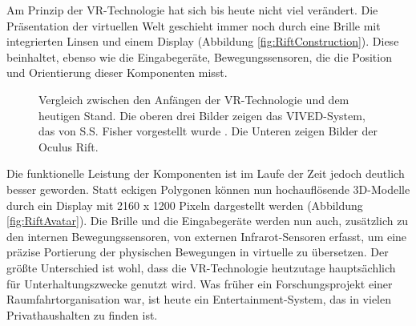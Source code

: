 Am Prinzip der VR-Technologie hat sich bis heute nicht viel verändert. Die Präsentation der virtuellen Welt geschieht immer noch durch eine Brille mit integrierten Linsen und einem Display (Abbildung \ref{fig:RiftConstruction}). Diese beinhaltet, ebenso wie die Eingabegeräte, Bewegungssensoren, die die Position und Orientierung dieser Komponenten misst.\\ 

\begin{figure}%
    \centering
    \qquad
    \qquad
    \qquad
    \qquad
    \qquad
    \caption{Vergleich zwischen den Anfängen der VR-Technologie und dem heutigen Stand. Die oberen drei Bilder zeigen das VIVED-System, das von S.S. Fisher vorgestellt wurde \cite{bib:NasaVr}. Die Unteren zeigen Bilder der Oculus Rift.}\label{fig:VIVED}%
\end{figure}

Die funktionelle Leistung der Komponenten ist im Laufe der Zeit jedoch deutlich besser geworden. Statt eckigen Polygonen können nun hochauflösende 3D-Modelle durch ein Display mit 2160 x 1200 Pixeln dargestellt werden (Abbildung \ref{fig:RiftAvatar}). Die Brille und die Eingabegeräte werden nun auch, zusätzlich zu den internen Bewegungssensoren, von externen Infrarot-Sensoren erfasst, um eine präzise Portierung der physischen Bewegungen in virtuelle zu übersetzen. Der größte Unterschied ist wohl, dass die VR-Technologie heutzutage hauptsächlich für Unterhaltungszwecke genutzt wird. Was früher ein Forschungsprojekt einer Raumfahrtorganisation war, ist heute ein Entertainment-System, das in vielen Privathaushalten zu finden ist.\\

